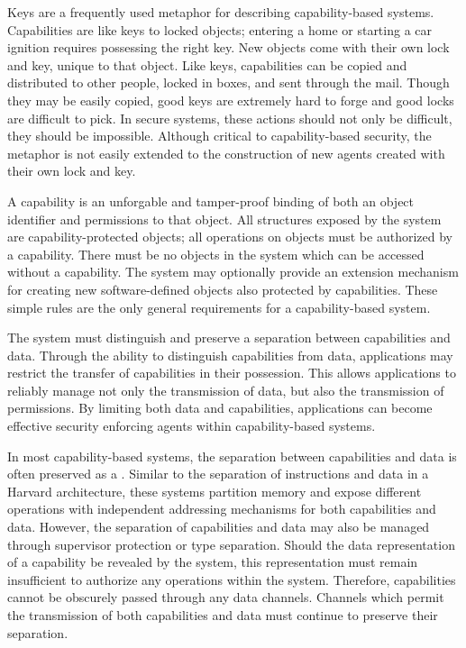 Keys are a frequently used metaphor for describing capability-based systems.
Capabilities are like keys to locked objects; entering a home or starting a car ignition requires possessing the right key.
New objects come with their own lock and key, unique to that object.
Like keys, capabilities can be copied and distributed to other people, locked in boxes, and sent through the mail.
Though they may be easily copied, good keys are extremely hard to forge and good locks are difficult to pick.
In secure systems, these actions should not only be difficult, they should be impossible.
Although critical to capability-based security, the metaphor is not easily extended to the construction of new agents created with their own lock and key.

A capability is an unforgable and tamper-proof binding of both an object identifier and permissions to that object.
All structures exposed by the system are capability-protected objects; all operations on objects must be authorized by a capability.
There must be no objects in the system which can be accessed without a capability.
The system may optionally provide an extension mechanism for creating new software-defined objects also protected by capabilities.
These simple rules are the only general requirements for a capability-based system.

The system must distinguish and preserve a separation between capabilities and data.
Through the ability to distinguish capabilities from data, applications may restrict the transfer of capabilities in their possession.
This allows applications to reliably manage not only the transmission of data, but also the transmission of permissions.
By limiting both data and capabilities, applications can become effective security enforcing agents within capability-based systems.

In most capability-based systems, the separation between capabilities and data is often preserved as a .
Similar to the separation of instructions and data in a Harvard architecture, these systems partition memory and expose different operations with independent addressing mechanisms for both capabilities and data.
However, the separation of capabilities and data may also be managed through supervisor protection or type separation.
Should the data representation of a capability be revealed by the system, this representation must remain insufficient to authorize any operations within the system.
Therefore, capabilities cannot be obscurely passed through any data channels.
Channels which permit the transmission of both capabilities and data must continue to preserve their separation.

